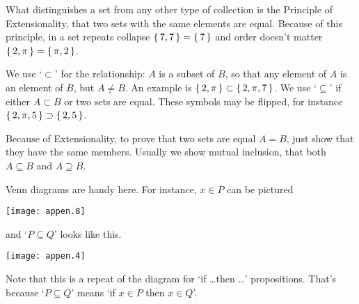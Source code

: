 What distinguishes a set from any other type of collection is 
the Principle of Extensionality, that two sets with the same elements
are equal.
Because of this principle, 
in a set repeats collapse \( \mbox{$\{\,7,7\,\}$}=\mbox{$\{\,7\,\}$} \) and order doesn't
matter \( \mbox{$\{\,2,\pi\,\}$}=\mbox{$\{\,\pi,2\,\}$} \).

We use
`\( \subset \)' for the %
relationship: \( A \) is a subset of \( B \), so that
any element of $A$ is an element of $B$, but \( A\neq B \).
An example is 
\( \mbox{$\{\,2,\pi\,\}$}\subset\mbox{$\{\,2,\pi,7\,\}$} \).
We use `\( \subseteq \)' if either $A\subset B$ or two sets are equal.
These symbols may be flipped, for instance
\( \mbox{$\{\, 2,\pi,5\,\}$}\supset\mbox{$\{\,2,5\,\}$} \).

Because of Extensionality, to prove that two sets are equal \( A=B \),
just show that they have the same members.
Usually we show mutual inclusion,%
that both \( A\subseteq B \) and \( A\supseteq B \).

Venn diagrams are handy here.
For instance, \( x\in P \) can be pictured
\begin{center}
  \texttt{[image: appen.8]}
%
\end{center}
and `\( P\subseteq Q \)' looks like this.
\begin{center}
  \texttt{[image: appen.4]}
\end{center}
\noindent
Note that this is a repeat of the diagram for `if \ldots then \ldots' 
propositions.
That's because `\( P\subseteq Q \)' means 
`if \( x\in P \) then \( x\in Q \)'.

